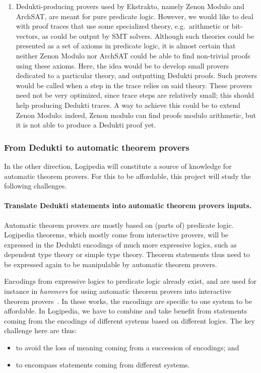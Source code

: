 \begin{enumerate}
\item Dedukti-producing provers used by Ekstrakto, namely Zenon Modulo
  and ArchSAT, are meant for pure predicate logic. However, we would
  like to deal with proof traces that use some specialized theory,
  e.g.\ arithmetic or bit-vectors, as could be output by SMT
  solvers. Although such theories could be presented as a set of
  axioms in predicate logic, it is almost certain that neither Zenon
  Modulo nor ArchSAT could be able to find non-trivial proofs using
  these axioms. Here, the idea would be to develop small provers
  dedicated to a particular theory, and outputting Dedukti
  proofs. Such provers would be called when a step in the trace relies
  on said theory. These provers need not be very optimized, since
  trace steps are relatively small; this should help producing Dedukti
  traces. A way to achieve this could be to extend Zenon Modulo:
  indeed, Zenon modulo can find proofs modulo arithmetic, but it is
  not able to produce a Dedukti proof yet.
\end{enumerate}
  
\subsubsection*{From Dedukti to automatic theorem provers}

In the other direction, Logipedia will constitute a source of
knowledge for automatic theorem provers. For this to be affordable,
this project will study the following challenges.

\paragraph*{Translate Dedukti statements into automatic theorem provers
  inputs.}
Automatic theorem provers are mostly based on (parts of) predicate
logic.  Logipedia theorems, which mostly come from interactive
provers, will be expressed in the Dedukti encodings of much more
expressive logics, such as dependent type theory or simple type
theory.  Theorem statements thus need to be expressed again to be
manipulable by automatic theorem provers.

Encodings from expressive logics to predicate logic already exist,
and are used for instance in {\em hammers} for using automatic theorem
provers into interactive theorem
provers~\cite{DBLP:conf/lpar/PaulsonB10,DBLP:journals/jar/CzajkaK18}.
In these works, the encodings are specific to one system to be
affordable. In Logipedia, we have to combine and take benefit from
statements coming from the encodings of different systems based on
different logics. The key challenge here are thus:
\begin{itemize}
\item to avoid the loss of meaning coming from a succession of
  encodings; and
  \item to encompass statements coming from different systems.
\end{itemize}

